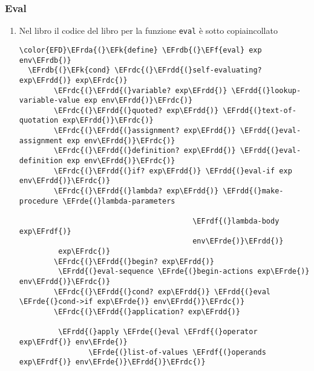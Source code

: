 \documentclass[11pt]{article}
\newcommand{\EFk}[1]{\textcolor{EFk}{#1}} %
\newcommand{\EFf}[1]{\textcolor{EFf}{#1}} %
\newcommand{\EFrda}[1]{\textcolor{EFrda}{#1}} %
\newcommand{\EFrdb}[1]{\textcolor{EFrdb}{#1}} %
\newcommand{\EFrdc}[1]{\textcolor{EFrdc}{#1}} %
\newcommand{\EFrdd}[1]{\textcolor{EFrdd}{#1}} %
\newcommand{\EFrde}[1]{\textcolor{EFrde}{#1}} %
\newcommand{\EFrdf}[1]{\textcolor{EFrdf}{#1}} %
\begin{document}
\subsubsection{Eval}
\label{sec:org9f2ed5b}
\begin{enumerate}
\item Nel libro
\label{sec:orgc7aded5}
il codice del libro per la funzione \texttt{eval} è sotto copiaincollato
\begin{Code}
\begin{Verbatim}
\color{EFD}\EFrda{(}\EFk{define} \EFrdb{(}\EFf{eval} exp env\EFrdb{)}
  \EFrdb{(}\EFk{cond} \EFrdc{(}\EFrdd{(}self-evaluating? exp\EFrdd{)} exp\EFrdc{)}
        \EFrdc{(}\EFrdd{(}variable? exp\EFrdd{)} \EFrdd{(}lookup-variable-value exp env\EFrdd{)}\EFrdc{)}
        \EFrdc{(}\EFrdd{(}quoted? exp\EFrdd{)} \EFrdd{(}text-of-quotation exp\EFrdd{)}\EFrdc{)}
        \EFrdc{(}\EFrdd{(}assignment? exp\EFrdd{)} \EFrdd{(}eval-assignment exp env\EFrdd{)}\EFrdc{)}
        \EFrdc{(}\EFrdd{(}definition? exp\EFrdd{)} \EFrdd{(}eval-definition exp env\EFrdd{)}\EFrdc{)}
        \EFrdc{(}\EFrdd{(}if? exp\EFrdd{)} \EFrdd{(}eval-if exp env\EFrdd{)}\EFrdc{)}
        \EFrdc{(}\EFrdd{(}lambda? exp\EFrdd{)} \EFrdd{(}make-procedure \EFrde{(}lambda-parameters

                                        \EFrdf{(}lambda-body exp\EFrdf{)}
                                        env\EFrde{)}\EFrdd{)}
         exp\EFrdc{)}
        \EFrdc{(}\EFrdd{(}begin? exp\EFrdd{)}
         \EFrdd{(}eval-sequence \EFrde{(}begin-actions exp\EFrde{)} env\EFrdd{)}\EFrdc{)}
        \EFrdc{(}\EFrdd{(}cond? exp\EFrdd{)} \EFrdd{(}eval \EFrde{(}cond->if exp\EFrde{)} env\EFrdd{)}\EFrdc{)}
        \EFrdc{(}\EFrdd{(}application? exp\EFrdd{)}

         \EFrdd{(}apply \EFrde{(}eval \EFrdf{(}operator exp\EFrdf{)} env\EFrde{)}
                \EFrde{(}list-of-values \EFrdf{(}operands exp\EFrdf{)} env\EFrde{)}\EFrdd{)}\EFrdc{)}


\end{Verbatim}
\end{Code}
\end{enumerate}
\end{document}
